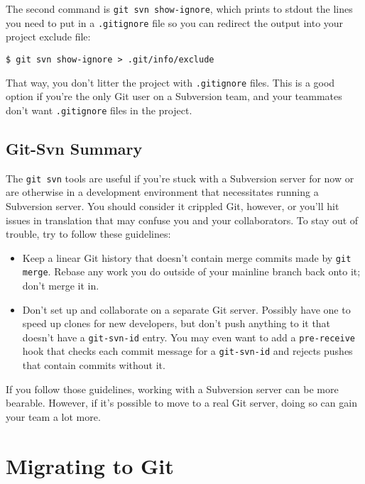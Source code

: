 \documentclass[a4paper]{book}
\begin{document}
The second command is \texttt{git svn show-ignore}, which prints to stdout the lines you need to put in a \texttt{.gitignore} file so you can redirect the output into your project exclude file:

\begin{shaded}\begin{verbatim}
$ git svn show-ignore > .git/info/exclude
\end{verbatim}\end{shaded}

That way, you don't litter the project with \texttt{.gitignore} files. This is a good option if you're the only Git user on a Subversion team, and your teammates don't want \texttt{.gitignore} files in the project.

\subsection{Git-Svn Summary}\label{git-svn-summary}

The \texttt{git svn} tools are useful if you're stuck with a Subversion server for now or are otherwise in a development environment that necessitates running a Subversion server. You should consider it crippled Git, however, or you'll hit issues in translation that may confuse you and your collaborators. To stay out of trouble, try to follow these guidelines:

\begin{itemize}
\itemsep1pt\parskip0pt
\item
  Keep a linear Git history that doesn't contain merge commits made by \texttt{git merge}. Rebase any work you do outside of your mainline branch back onto it; don't merge it in.
\item
  Don't set up and collaborate on a separate Git server. Possibly have one to speed up clones for new developers, but don't push anything to it that doesn't have a \texttt{git-svn-id} entry. You may even want to add a \texttt{pre-receive} hook that checks each commit message for a \texttt{git-svn-id} and rejects pushes that contain commits without it.
\end{itemize}

If you follow those guidelines, working with a Subversion server can be more bearable. However, if it's possible to move to a real Git server, doing so can gain your team a lot more.

\section{Migrating to Git}\label{migrating-to-git}
\end{document}
